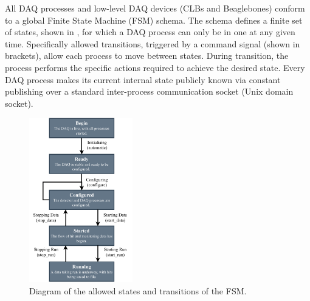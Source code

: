 All DAQ processes and low-level DAQ devices (CLBs and Beaglebones) conform to a global Finite
State Machine (FSM) schema. The schema defines a finite set of states, shown in
, for which a DAQ process can only be in one at any given time. Specifically
allowed transitions, triggered by a command signal (shown in brackets), allow each process to move
between states. During transition, the process performs the specific actions required to achieve
the desired state. Every DAQ process makes its current internal state publicly known via constant
publishing over a standard inter-process communication socket (Unix domain socket).

\begin{figure} %
    \includegraphics[width=0.4\textwidth]{diagrams/5-daq/fsm.pdf}
    \caption[Diagram of the allowed states and transitions of the \chipsfive Finite State Machine]
    {Diagram of the allowed states and transitions of the \chipsfive FSM.}
    \label{fig:fsm}
\end{figure}

